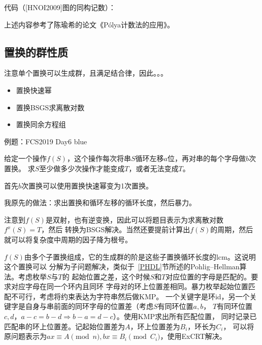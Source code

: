 代码（[HNOI2009]图的同构记数）：


上述内容参考了陈瑜希的论文《Pólya计数法的应用》。
\subsection{置换的群性质}
注意单个置换可以生成群，且满足结合律，因此。。。

\begin{itemize}
	\item 置换快速幂
	\item 置换BSGS求离散对数
	\item 置换同余方程组
\end{itemize}


例题：FCS2019 Day6 blue

给定一个操作$f(S)$，这个操作每次将串$S$循环左移$a$位，再对串的每个字母做$b$次置换。
求$S$至少做多少次操作才能变成$T$，或者无法变成$T$。

首先$b$次置换可以使用置换快速幂变为1次置换。

我原先的做法：求出置换和循环左移的循环长度，然后暴力。

注意到$f(S)$是双射，也有逆变换，因此可以将题目表示为求离散对数$f^x(S)=T$，然后
转换为BSGS解决。当然还要提前计算出$f(S)$的周期，然后就可以将复杂度中周期的因子降为根号。

$f(S)$由多个子置换组成，它的生成群的阶是这些子置换循环长度的lcm。这说明这个置换可以
分解为子问题解决，类似于~\ref{PHDL}节所述的Pohlig–Hellman算法。考虑枚举$S$与$T$的
起始位置之差，这个时候$S$和$T$对应位置的字母是匹配的。要求对应字母在同一个环内且同环
字母对的环上位置差相同。暴力枚举起始位置匹配不可行，考虑将约束表达为字符串然后做KMP。
一个关键字是环id，另一个关键字是自身与串前面的同环字母的位置差（考虑$S$有同环位置$a,b$，
$T$有同环位置$c,d$，$a-c=b-d\Rightarrow b-a=d-c$）。使用KMP求出所有匹配位置，
同时记录已匹配串的环上位置差。记起始位置差为$A$，环上位置差为$B_i$，环长为$C_i$，
可以将原问题表示为$ax\equiv A\pmod{n},bx\equiv B_i\pmod{C_i}$，使用ExCRT解决。
